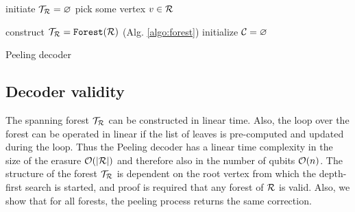 \begin{algorithm}[htb]
  \BlankLine
  \BlankLine
  initiate $\mathcal{T}_{\mathcal{R}} = \varnothing$ \;
  pick some vertex $v \in \mathcal{R}$ \;
  \BlankLine
  \caption{}\label{algo:forest}
\end{algorithm}



\begin{algorithm}[htb]
  \BlankLine
  \BlankLine
  construct $\mathcal{T}_{\mathcal{R}} = \texttt{Forest}(\mathcal{R})$ (Alg. \ref{algo:forest})\;
  initialize $\mathcal{C} = {\varnothing}$\;
  \BlankLine
  \caption{Peeling decoder \cite{delfosse2017linear}}\label{algo:peel}
\end{algorithm}

\subsection{Decoder validity}
The spanning forest $\mathcal{T}_{\mathcal{R}}$ can be constructed in linear time. Also, the loop over the forest can be operated in linear if the list of leaves is pre-computed and updated during the loop. Thus the Peeling decoder has a linear time complexity in the size of the erasure $\mathcal{O}(\abs{\mathcal{R}})$ and therefore also in the number of qubits $\mathcal{O}(n)$. The structure of the forest $\mathcal{T}_{\mathcal{R}}$ is dependent on the root vertex from which the depth-first search is started, and proof is required that any forest of $\mathcal{R}$ is valid. Also, we show that for all forests, the peeling process returns the same correction.

